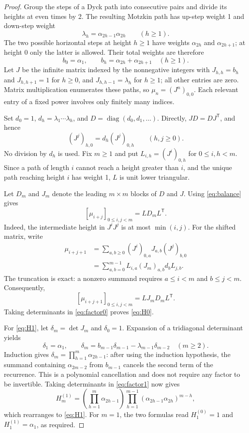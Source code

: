 \documentclass[11pt]{article}
\theoremstyle{remark}
\newcommand{\transpose}{\mathsf T}
\begin{document}
\begin{proof}
Group the steps of a Dyck path into consecutive pairs and divide its
heights at even times by 2. The resulting Motzkin path has up-step weight
1 and down-step weight
\[
 \lambda_h=\alpha_{2h-1}\alpha_{2h}\qquad(h\ge1).
\]
The two possible horizontal steps at height $h\ge1$ have weights
$\alpha_{2h}$ and $\alpha_{2h+1}$; at height 0 only the latter is allowed.
Their total weights are therefore
\[
 b_0=\alpha_1,\qquad b_h=\alpha_{2h}+\alpha_{2h+1}\quad(h\ge1).
\]
Let $J$ be the infinite matrix indexed by the nonnegative integers with
$J_{h,h}=b_h$ and $J_{h,h+1}=1$ for $h\ge0$, and
$J_{h,h-1}=\lambda_h$ for $h\ge1$; all other entries are zero.
Matrix multiplication enumerates these paths,
so $\mu_n=(J^n)_{0,0}$. Each relevant entry of a fixed power involves only
finitely many indices.

Set $d_0=1$, $d_h=\lambda_1\cdots\lambda_h$, and
$D=\operatorname{diag}(d_0,d_1,\ldots)$. Directly,
$JD=DJ^\transpose$, and hence
\begin{equation}\label{eq:balance}
 (J^j)_{h,0}=d_h(J^j)_{0,h}\qquad(h,j\ge0).
\end{equation}
No division by $d_h$ is used. Fix $m\ge1$ and put
$L_{i,h}=(J^i)_{0,h}$ for $0\le i,h<m$. Since a path of length $i$
cannot reach a height greater than $i$, and the unique path reaching
height $i$ has weight 1, $L$ is unit lower triangular.

Let $D_m$ and $J_m$ denote the leading $m\times m$ blocks of $D$ and $J$.
Using \eqref{eq:balance} gives
\begin{equation}\label{eq:factor0}
 [\mu_{i+j}]_{0\le i,j<m}=LD_mL^\transpose.
\end{equation}
Indeed, the intermediate height in $J^iJ^j$ is at most $\min(i,j)$.
For the shifted matrix, write
\begin{align*}
 \mu_{i+j+1}
 &=\sum_{a,b\ge0}(J^i)_{0,a}J_{a,b}(J^j)_{b,0}\\
 &=\sum_{a,b=0}^{m-1}L_{i,a}(J_m)_{a,b}d_bL_{j,b}.
\end{align*}
The truncation is exact: a nonzero summand requires $a\le i<m$ and
$b\le j<m$. Consequently,
\begin{equation}\label{eq:factor1}
 [\mu_{i+j+1}]_{0\le i,j<m}=LJ_mD_mL^\transpose.
\end{equation}
Taking determinants in \eqref{eq:factor0} proves \eqref{eq:H0}.

For \eqref{eq:H1}, let $\delta_m=\det J_m$ and $\delta_0=1$.
Expansion of a tridiagonal determinant yields
\[
 \delta_1=\alpha_1,\qquad
 \delta_m=b_{m-1}\delta_{m-1}
             -\lambda_{m-1}\delta_{m-2}\quad(m\ge2).
\]
Induction gives $\delta_m=\prod_{h=1}^{m}\alpha_{2h-1}$: after using the
induction hypothesis, the summand containing $\alpha_{2m-2}$ from
$b_{m-1}$ cancels the second term of the recurrence. This is a polynomial
cancellation and does not require any factor to be invertible.
Taking determinants in \eqref{eq:factor1} now gives
\[
 H_m^{(1)}=\left(\prod_{h=1}^m\alpha_{2h-1}\right)
              \prod_{h=1}^{m-1}(\alpha_{2h-1}\alpha_{2h})^{m-h},
\]
which rearranges to \eqref{eq:H1}. For $m=1$, the two formulas read
$H_1^{(0)}=1$ and $H_1^{(1)}=\alpha_1$, as required.
\end{proof}
\end{document}
